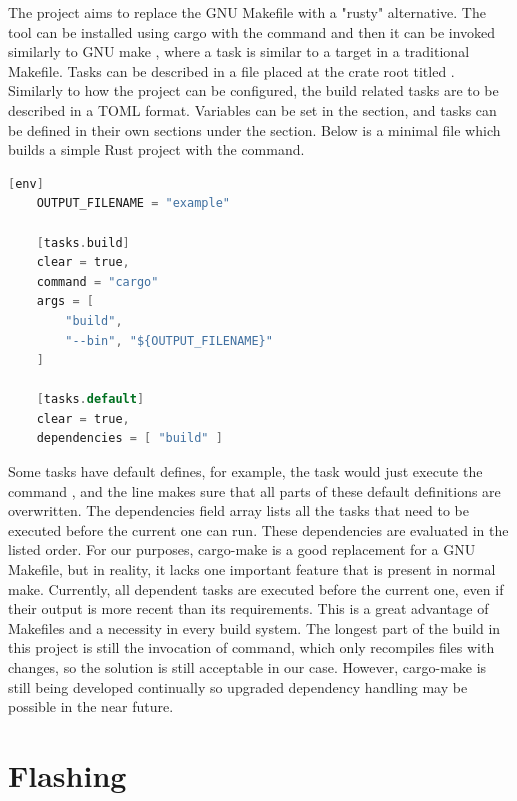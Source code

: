 The  \cite{CargoMake} project aims to replace the GNU Makefile with a "rusty" alternative. The tool can be installed using cargo with the command  and then it can be invoked similarly to GNU make , where a task is similar to a target in a traditional Makefile. Tasks can be described in a file placed at the crate root titled . Similarly to how the project can be configured, the build related tasks are to be described in a TOML format. Variables can be set in the \mycode{[env]} section, and tasks can be defined in their own sections under the  section. Below is a minimal  file which builds a simple Rust project with the  command.

\begin{lstlisting}[language=C,frame=single,float=!ht,label={lst:cargo-task-example},caption={Cargo Make Task Example}]
    [env]
    OUTPUT_FILENAME = "example"

    [tasks.build]
    clear = true,
    command = "cargo"
    args = [
        "build",
        "--bin", "${OUTPUT_FILENAME}"
    ]

    [tasks.default]
    clear = true,
    dependencies = [ "build" ]
\end{lstlisting}

Some tasks have default defines, for example, the  task would just execute the command , and the  line makes sure that all parts of these default definitions are overwritten. The dependencies field array lists all the tasks that need to be executed before the current one can run. These dependencies are evaluated in the listed order. For our purposes, cargo-make is a good replacement for a GNU Makefile, but in reality, it lacks one important feature that is present in normal make. Currently, all dependent tasks are executed before the current one, even if their output is more recent than its requirements. This is a great advantage of Makefiles and a necessity in every build system. The longest part of the build in this project is still the invocation of  command, which only recompiles files with changes, so the solution is still acceptable in our case. However, cargo-make is still being developed continually so upgraded dependency handling may be possible in the near future.

\section{Flashing}

